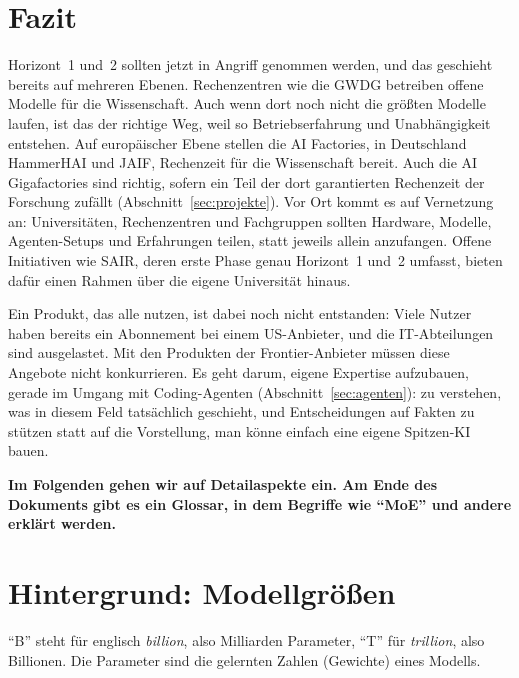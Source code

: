 \documentclass[a4paper,11pt]{article}
\begin{document}
\section{Fazit}
\label{sec:fazit}
\enlargethispage{\baselineskip}

Horizont~1 und~2 sollten jetzt in Angriff genommen werden, und das
geschieht bereits auf mehreren Ebenen. Rechenzentren wie die GWDG
betreiben offene Modelle für die Wissenschaft. Auch wenn dort noch
nicht die größten Modelle laufen, ist das der richtige
Weg, weil so Betriebserfahrung und Unabhängigkeit entstehen. Auf
europäischer Ebene stellen die AI Factories, in Deutschland HammerHAI
und JAIF, Rechenzeit für die Wissenschaft bereit. Auch die AI
Gigafactories sind richtig, sofern ein Teil der dort garantierten
Rechenzeit der Forschung zufällt (Abschnitt~\ref{sec:projekte}). Vor
Ort kommt es auf Vernetzung an: Universitäten, Rechenzentren und
Fachgruppen sollten Hardware, Modelle, Agenten-Setups und Erfahrungen
teilen, statt jeweils allein anzufangen. Offene Initiativen wie SAIR,
deren erste Phase genau Horizont~1 und~2 umfasst, bieten dafür einen
Rahmen über die eigene Universität hinaus.

Ein Produkt, das alle nutzen, ist dabei noch nicht entstanden: Viele
Nutzer haben bereits ein Abonnement bei einem US-Anbieter, und die
IT-Abteilungen sind ausgelastet.  Mit den Produkten der
Frontier-Anbieter müssen diese Angebote nicht konkurrieren.  Es geht
darum, eigene
Expertise aufzubauen, gerade im Umgang mit Coding-Agenten
(Abschnitt~\ref{sec:agenten}): zu verstehen, was in diesem Feld tatsächlich
geschieht, und Entscheidungen auf Fakten zu stützen statt auf die
Vorstellung, man könne einfach eine eigene Spitzen-KI bauen.


\textbf{Im Folgenden gehen wir auf Detailaspekte ein.  Am Ende des Dokuments gibt es ein Glossar, in dem Begriffe wie \enquote{MoE} und andere erklärt werden.} 
\section{Hintergrund: Modellgrößen}
\label{sec:groessen}

\enquote{B} steht für englisch \emph{billion}, also Milliarden
Parameter, \enquote{T} für \emph{trillion}, also Billionen.  Die
Parameter sind die gelernten Zahlen (Gewichte) eines Modells.
\end{document}
